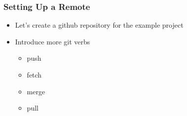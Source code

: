 \begin{frame}
  \frametitle{Setting Up a Remote}
  \begin{itemize}
    \item Let's create a github repository for the example project
    \item Introduce more git verbs
      \begin{itemize}
        \item push
        \item fetch
        \item merge
        \item pull
      \end{itemize}
  \end{itemize}
\end{frame}
